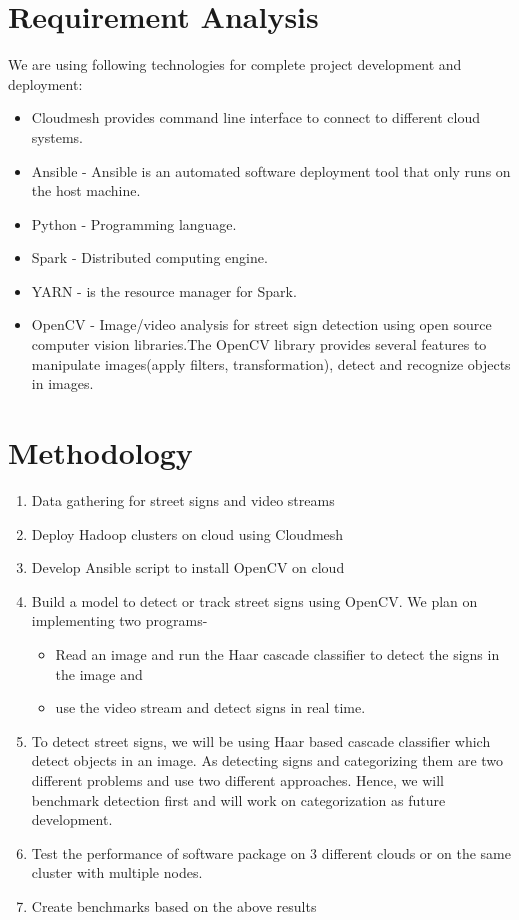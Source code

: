 \documentclass[9pt,twocolumn,twoside]{../../styles/osajnl}
\begin{document}
\section{Requirement Analysis}
We are using following technologies for complete project development
and deployment:
\begin{itemize}
\item Cloudmesh provides command line interface to connect to different cloud systems.
\item Ansible - Ansible is an automated software deployment tool that only runs on the host machine.
\item Python - Programming language. 
\item Spark - Distributed computing engine.
\item YARN - is the resource manager for Spark.

\item OpenCV \cite{www-opencv} - Image/video analysis for street sign detection using open source computer vision libraries.The OpenCV library provides several features to  manipulate images(apply filters, transformation), detect and recognize objects in images.
\end{itemize}

\section{Methodology}
\begin{enumerate}
\item Data gathering for street signs and video streams
\item Deploy Hadoop clusters on cloud using Cloudmesh
\item Develop Ansible script to install OpenCV on cloud
\item Build a model to detect or track street signs using OpenCV. We
  plan on implementing two programs-
    \begin{itemize}
    \item Read an image and run the Haar cascade classifier to detect
      the signs in the image and
    \item use the video stream and detect signs in real time.
    \end{itemize}
\item To detect street signs, we will be using Haar based cascade
  classifier which detect objects in an image. As detecting signs and
  categorizing them are two different problems and use two different
  approaches. Hence, we will benchmark detection first and will work
  on categorization as future development.
\item Test the performance of software package on 3 different clouds
  or on the same cluster with multiple nodes.
\item Create benchmarks based on the above results

\end{enumerate}
\end{document}
